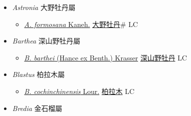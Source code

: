 
  \begin{itemize}
 \item[] \textit{Astronia} 大野牡丹屬
                    
  \begin{itemize}
        \item[] \href{http://www.theplantlist.org/tpl1.1/search?q=Astronia+formosana}{\textit{A. formosana} Kaneh.}   \href{\detokenize{http://taibnet.sinica.edu.tw/chi/taibnet_species_list.php?T2=大野牡丹&T2_new_value=true&fr=y}}{大野牡丹}\# LC
  \end{itemize}
 \item[] \textit{Barthea} 深山野牡丹屬
                    
  \begin{itemize}
        \item[] \href{http://www.theplantlist.org/tpl1.1/search?q=Barthea+barthei}{\textit{B. barthei} (Hance ex Benth.) Krasser}   \href{\detokenize{http://taibnet.sinica.edu.tw/chi/taibnet_species_list.php?T2=深山野牡丹&T2_new_value=true&fr=y}}{深山野牡丹} LC
  \end{itemize}
 \item[] \textit{Blastus} 柏拉木屬
                    
  \begin{itemize}
        \item[] \href{http://www.theplantlist.org/tpl1.1/search?q=Blastus+cochinchinensis}{\textit{B. cochinchinensis} Lour.}   \href{\detokenize{http://taibnet.sinica.edu.tw/chi/taibnet_species_list.php?T2=柏拉木&T2_new_value=true&fr=y}}{柏拉木} LC
  \end{itemize}
 \item[] \textit{Bredia} 金石榴屬
                    

\end{itemize}
